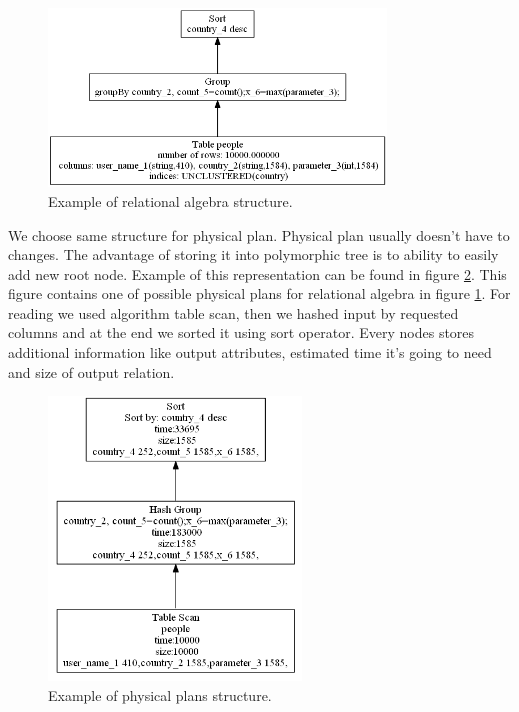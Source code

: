 \begin{figure}[h!]
  \centering
    \includegraphics[width=0.8\textwidth]{groupalgebra}

      \caption{Example of relational algebra structure.}
          \label{fig:groupalgebra}
\end{figure}

We choose same structure for physical plan. Physical plan usually doesn't have to changes. The advantage of storing it into polymorphic tree is to ability to easily add new root node. Example of this representation can be found in figure \ref{fig:groupplan}. This figure contains one of possible physical plans for relational algebra in figure  \ref{fig:groupalgebra}. For reading we used algorithm table scan, then we hashed input by requested columns and at the end we sorted it using sort operator. Every nodes stores additional information like output attributes, estimated time it's going to need and size of output relation.

\begin{figure}[h!]
  \centering
    \includegraphics[width=0.6\textwidth]{groupplan}

      \caption{Example of physical plans structure.}
          \label{fig:groupplan}
\end{figure}

